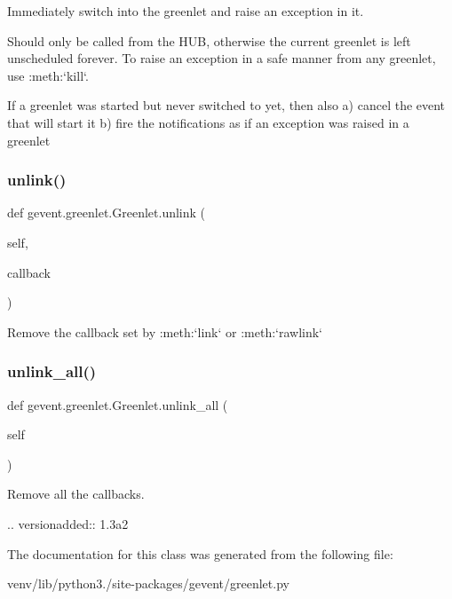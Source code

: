 \begin{DoxyVerb}Immediately switch into the greenlet and raise an exception in it.

Should only be called from the HUB, otherwise the current greenlet is left unscheduled forever.
To raise an exception in a safe manner from any greenlet, use :meth:`kill`.

If a greenlet was started but never switched to yet, then also
a) cancel the event that will start it
b) fire the notifications as if an exception was raised in a greenlet
\end{DoxyVerb}
 \mbox{\label{classgevent_1_1greenlet_1_1_greenlet_a49348774b0a7f20c389c3157be70cb12}} 
\subsubsection{\texorpdfstring{unlink()}{unlink()}}
{\footnotesize\ttfamily def gevent.\+greenlet.\+Greenlet.\+unlink (\begin{DoxyParamCaption}\item[{}]{self,  }\item[{}]{callback }\end{DoxyParamCaption})}

\begin{DoxyVerb}Remove the callback set by :meth:`link` or :meth:`rawlink`\end{DoxyVerb}
 \mbox{\label{classgevent_1_1greenlet_1_1_greenlet_aac0de9949bd80dab1d419fcae124a952}} 
\subsubsection{\texorpdfstring{unlink\+\_\+all()}{unlink\_all()}}
{\footnotesize\ttfamily def gevent.\+greenlet.\+Greenlet.\+unlink\+\_\+all (\begin{DoxyParamCaption}\item[{}]{self }\end{DoxyParamCaption})}

\begin{DoxyVerb}Remove all the callbacks.

.. versionadded:: 1.3a2
\end{DoxyVerb}
 

The documentation for this class was generated from the following file\+:\begin{DoxyCompactItemize}
\item 
venv/lib/python3./site-\/packages/gevent/greenlet.\+py\end{DoxyCompactItemize}
